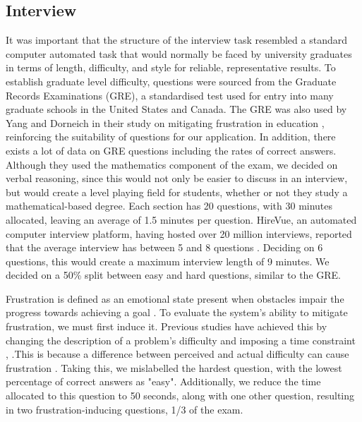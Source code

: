 \documentclass[12pt,a4paper]{article}
\begin{document}
\subsection*{Interview}
It was important that the structure of the interview task resembled a standard computer automated task that would normally be faced by university graduates in terms of length, difficulty, and style for reliable, representative results. To establish graduate level difficulty, questions were sourced from the Graduate Records Examinations (GRE), a standardised test used for entry into many graduate schools in the United States and Canada. The GRE was also used by Yang and Dorneich in their study on mitigating frustration in education \cite{yang2018evaluating}, reinforcing the suitability of questions for our application. In addition, there exists a lot of data on GRE questions including the rates of correct answers. Although they used the mathematics component of the exam, we decided on verbal reasoning, since this would not only be easier to discuss in an interview, but would create a level playing field for students, whether or not they study a mathematical-based degree. Each section has 20 questions, with 30 minutes allocated, leaving an average of 1.5 minutes per question. HireVue, an automated computer interview platform, having hosted over 20 million interviews, reported that the average interview has between 5 and 8 questions \cite{hirevue}. Deciding on 6 questions, this would create a maximum interview length of 9 minutes. We decided on a 50\% split between easy and hard questions, similar to the GRE.

Frustration is defined as an emotional state present when obstacles impair the progress towards achieving a goal \cite{lawson1965frustration}. To evaluate the system's ability to mitigate frustration, we must first induce it. Previous studies have achieved this by changing the description of a problem's difficulty and imposing a time constraint \cite{dennerlein2003frustrating},  \cite{yang2018evaluating}.This is because a difference between perceived and actual difficulty can cause frustration \cite{hone2006empathic}. Taking this, we mislabelled the hardest question, with the lowest percentage of correct answers as "easy". Additionally, we reduce the time allocated to this question to 50 seconds, along with one other question, resulting in two frustration-inducing questions, 1/3 of the exam.
\end{document}
